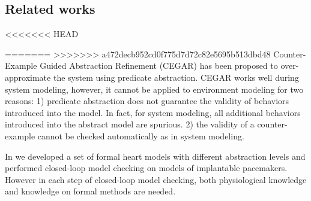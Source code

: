 \subsection{Related works}
<<<<<<< HEAD

=======
>>>>>>> a472decb952cd0f775d7d72c82e5695b513dbd48
Counter-Example Guided Abstraction Refinement (CEGAR) \cite{CEGAR} has been proposed to over-approximate the system using predicate abstraction. 
CEGAR works well during system modeling, however, it cannot be applied to environment modeling for two reasons: 1) predicate abstraction does not guarantee the validity of behaviors introduced into the model. In fact, for system modeling, all additional behaviors introduced into the abstract model are spurious. 2) the validity of a counter-example cannot be checked automatically as in system modeling. 


In \cite{sttt13} we developed a set of formal heart models with different abstraction levels and performed closed-loop model checking on models of implantable pacemakers. 
However in each step of closed-loop model checking, both physiological knowledge and knowledge on formal methods are needed.

